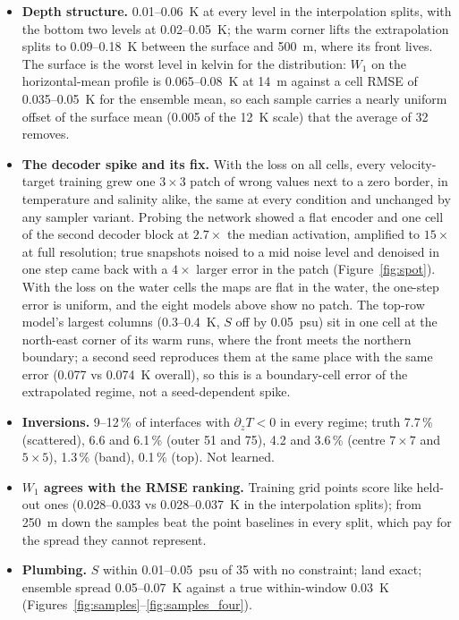 \documentclass[11pt,a4paper]{article}
\begin{document}
\begin{itemize}
        wins at every level (Figure~\ref{fig:four}).
  \item \textbf{Depth structure.} 0.01--\SI{0.06}{K} at every level in the interpolation splits, with the bottom
        two levels at 0.02--\SI{0.05}{K}; the warm corner lifts the extrapolation splits to 0.09--\SI{0.18}{K} between
        the surface and \SI{500}{m}, where its front lives. The surface is the worst level in kelvin for the
        distribution: $W_1$ on the horizontal-mean profile is 0.065--\SI{0.08}{K} at \SI{14}{m} against a cell RMSE
        of 0.035--\SI{0.05}{K} for the ensemble mean, so each sample carries a nearly uniform offset of the surface
        mean (0.005 of the \SI{12}{K} scale) that the average of 32 removes.
  \item \textbf{The decoder spike and its fix.} With the loss on all cells, every velocity-target training grew
        one $3\times3$ patch of wrong values next to a zero border, in temperature and salinity alike, the same at
        every condition and unchanged by any sampler variant. Probing the network showed a flat encoder and one cell
        of the second decoder block at $2.7\times$ the median activation, amplified to $15\times$ at full resolution;
        true snapshots noised to a mid noise level and denoised in one step came back with a $4\times$ larger error
        in the patch (Figure~\ref{fig:spot}). With the loss on the water cells the maps are flat in the water, the
        one-step error is uniform, and the eight models above show no patch. The top-row model's largest columns
        (0.3--\SI{0.4}{K}, $S$ off by \SI{0.05}{psu}) sit in one cell at the north-east corner of its warm runs,
        where the front meets the northern boundary; a second seed reproduces them at the same place with the same
        error (0.077 vs \SI{0.074}{K} overall), so this is a boundary-cell error of the extrapolated regime, not a
        seed-dependent spike.
  \item \textbf{Inversions.} 9--12\,\% of interfaces with $\partial_z T < 0$ in every regime; truth 7.7\,\%
        (scattered), 6.6 and 6.1\,\% (outer 51 and 75), 4.2 and 3.6\,\% (centre $7\times7$ and $5\times5$), 1.3\,\%
        (band), 0.1\,\% (top). Not learned.
  \item \textbf{$W_1$ agrees with the RMSE ranking.} Training grid points score like held-out ones (0.028--0.033 vs
        0.028--\SI{0.037}{K} in the interpolation splits); from \SI{250}{m} down the samples beat the point baselines in
        every split, which pay for the spread they cannot represent.
  \item \textbf{Plumbing.} $S$ within 0.01--\SI{0.05}{psu} of 35 with no constraint; land exact; ensemble spread
        0.05--\SI{0.07}{K} against a true within-window \SI{0.03}{K}
        (Figures~\ref{fig:samples}--\ref{fig:samples_four}).
\end{itemize}
\end{document}
